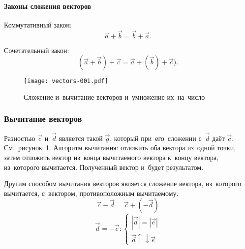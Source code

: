 \documentclass[]{scrartcl}
\begin{document}
\paragraph{Законы сложения векторов}

Коммутативный закон:
\begin{equation}\label{eq:vec-sum-rule1}
\vec{a} + \vec{b} = \vec{b} + \vec{a}.
\end{equation} 

Сочетательный закон:
\begin{equation}\label{eq:vec-sum-rule2}
(\vec{a} + \vec{b}) + \vec{c} = \vec{a} + (\vec{b})+\vec{c}).
\end{equation} 

\begin{figure}[ht]
	\centering %
	\texttt{[image: vectors-001.pdf]}
	\caption{Сложение и~вычитание векторов и~умножение их~на~число}\label{fig:vec-sum-1}
\end{figure} 

\subsubsection{Вычитание векторов} 
Разностью ${\textstyle \vec{c}}$ и~${\textstyle \vec{d}}$ является такой ${\textstyle \vec{g}}$, который при~его~сложении с~${\textstyle \vec{d}}$ даёт ${\textstyle \vec{c}}$. См.~рисунок~\ref{fig:vec-sum-1}. Алгоритм вычитания: отложить оба вектора из~одной точки, затем отложить вектор из~конца вычитаемого вектора к~концу вектора, из~которого вычитается. Полученный вектор и~будет результатом.

Другим способом вычитания векторов является сложение вектора, из~которого вычитается, с~вектором, противоположным вычитаемому.
\begin{equation}\label{eq:vec-subtraction-1}
\vec{c}-\vec{d} = \vec{c} + (-\vec{d})
\end{equation}
\begin{equation}\label{eq:vec-subtraction-2}
\vec{d} = -\vec{e}:
\begin{cases}
|\vec{d}|=|\vec{e}|\\
\vec{d}\uparrow \downarrow \vec{e}
\end{cases}
\end{equation}
\end{document}
